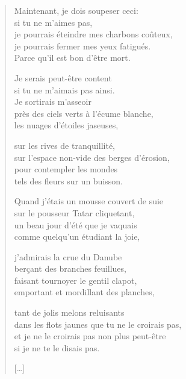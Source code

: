 \documentclass[11pt]{book}
\newcommand*{\centeredornament}{\centerline{\pgfornament[width=6cm]{88}}}
\begin{document}
\newpage

\vspace*{-15mm}
\centeredornament



\begin{verse}
  Maintenant, je dois soupeser ceci: \\
  si tu ne m'aimes pas, \\
  je pourrais éteindre mes charbons coûteux, \\
  je pourrais fermer mes yeux fatigués. \\
  Parce qu'il est bon d'être mort.

  Je serais peut-être content \\
  si tu ne m'aimais pas ainsi. \\
  Je sortirais m'asseoir \\
  près des ciels verts à l'écume blanche, \\
  les nuages d'étoiles jaseuses,

  sur les rives de tranquillité, \\
  sur l'espace non-vide des berges d'érosion, \\
  pour contempler les mondes \\
  tels des fleurs sur un buisson.

  Quand j'étais un mousse couvert de suie \\
  sur le pousseur Tatar cliquetant, \\
  un beau jour d'été que je vaquais \\
  comme quelqu'un étudiant la joie,

  j'admirais la crue du Danube \\
  berçant des branches feuillues, \\
  faisant tournoyer le gentil clapot, \\
  emportant et mordillant des planches,

  tant de jolis melons reluisants \\
  dans les flots jaunes que tu ne le croirais pas, \\
  et je ne le croirais pas non plus peut-être \\
  si je ne te le disais pas.

  \hfill [\ldots]
\end{verse}

\newpage

\vspace*{-15mm}
\centeredornament
\end{document}

